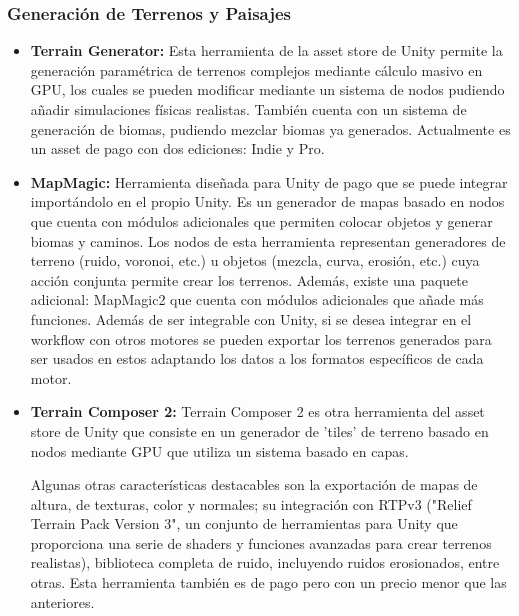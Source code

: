         \subsubsection{Generación de Terrenos y Paisajes} 
            \begin{itemize}[label=\textbullet]
                \item \textbf{Terrain Generator: }   
                Esta herramienta de la asset store de Unity permite la generación paramétrica de terrenos complejos mediante cálculo masivo en GPU, los cuales se pueden modificar mediante un sistema de nodos pudiendo añadir simulaciones físicas realistas. También cuenta con un sistema de generación de biomas, pudiendo mezclar biomas ya generados. Actualmente es un asset de pago con dos ediciones: Indie y Pro. \cite{unity-assetstore-terrain-generator-vista-pro}

                \item \textbf{MapMagic:} 
                Herramienta diseñada para Unity de pago que se puede integrar importándolo en el propio Unity. Es un generador de mapas basado en nodos que cuenta con módulos adicionales que permiten colocar objetos y generar biomas y caminos. Los nodos de esta herramienta representan generadores de terreno (ruido, voronoi, etc.) u objetos (mezcla, curva, erosión, etc.) cuya acción conjunta permite crear los terrenos. Además, existe una paquete adicional: MapMagic2 que cuenta con módulos adicionales que añade más funciones. Además de ser integrable con Unity, si se desea integrar en el workflow con otros motores se pueden exportar los terrenos generados para ser usados en estos adaptando los datos a los formatos específicos de cada motor. \cite{unity-assetstore-mapmagic-world-generator}
                
                \item \textbf{Terrain Composer 2: }
                Terrain Composer 2 es otra herramienta del asset store de Unity que consiste en un generador de 'tiles' de terreno basado en nodos mediante GPU que utiliza un sistema basado en capas.

                Algunas otras características destacables son la exportación de mapas de altura, de texturas, color y normales; su integración con RTPv3 ("Relief Terrain Pack Version 3", un conjunto de herramientas para Unity que proporciona una serie de shaders y funciones avanzadas para crear terrenos realistas), biblioteca completa de ruido, incluyendo ruidos erosionados, entre otras. Esta herramienta también es de pago pero con un precio menor que las anteriores. \cite{unity-assetstore-terrain-composer-2}
                

\end{itemize}
